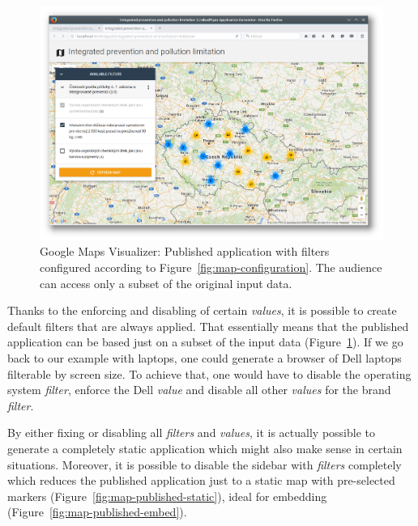 \begin{figure}
	\centering
	\includegraphics[width=145mm]{img/06_map_published}
	\caption{Google Maps Visualizer: Published application with filters configured according to Figure~\ref{fig:map-configuration}. The audience can access only a subset of the original input data.}
    \label{fig:map-published}
\end{figure}

Thanks to the enforcing and disabling of certain \emph{values}, it is possible to create default filters that are always applied. That essentially means that the published application can be based just on a subset of the input data (Figure~\ref{fig:map-published}). If we go back to our example with laptops, one could generate a browser of Dell laptops filterable by screen size. To achieve that, one would have to disable the operating system \emph{filter}, enforce the Dell \emph{value} and disable all other \emph{values} for the brand \emph{filter}.

By either fixing or disabling all \emph{filters} and \emph{values}, it is actually possible to generate a completely static application which might also make sense in certain situations. Moreover, it is possible to disable the sidebar with \emph{filters} completely which reduces the published application just to a static map with pre-selected markers (Figure~\ref{fig:map-published-static}), ideal for embedding (Figure~\ref{fig:map-published-embed}).

